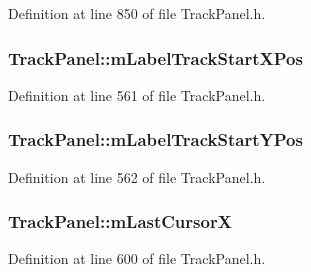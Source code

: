 Definition at line 850 of file Track\+Panel.\+h.

\subsubsection[{\texorpdfstring{m\+Label\+Track\+Start\+X\+Pos}{mLabelTrackStartXPos}}]{ Track\+Panel\+::m\+Label\+Track\+Start\+X\+Pos\hspace{0.3cm}{\ttfamily [protected]}}\hypertarget{class_track_panel_a42584f68b419de73ce42c7b15d7a4828}{}\label{class_track_panel_a42584f68b419de73ce42c7b15d7a4828}


Definition at line 561 of file Track\+Panel.\+h.

\subsubsection[{\texorpdfstring{m\+Label\+Track\+Start\+Y\+Pos}{mLabelTrackStartYPos}}]{ Track\+Panel\+::m\+Label\+Track\+Start\+Y\+Pos\hspace{0.3cm}{\ttfamily [protected]}}\hypertarget{class_track_panel_a43f6840103e4cd755efd0f46edd0eb2e}{}\label{class_track_panel_a43f6840103e4cd755efd0f46edd0eb2e}


Definition at line 562 of file Track\+Panel.\+h.

\subsubsection[{\texorpdfstring{m\+Last\+CursorX}{mLastCursorX}}]{ Track\+Panel\+::m\+Last\+CursorX\hspace{0.3cm}{\ttfamily [protected]}}\hypertarget{class_track_panel_a8230d698d20caedc299b1dc46b76a009}{}\label{class_track_panel_a8230d698d20caedc299b1dc46b76a009}


Definition at line 600 of file Track\+Panel.\+h.

